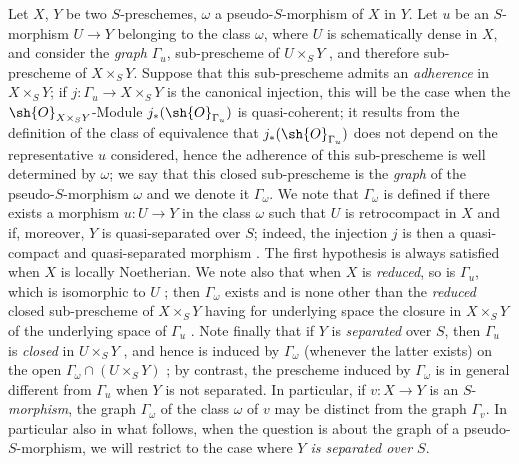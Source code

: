 \begin{env}[20.4.1]
\label{IV.20.4.1}
Let $X$, $Y$ be two $S$-preschemes, $\omega$ a pseudo-$S$-morphism of $X$ in $Y$.
Let $u$ be an $S$-morphism $U\to Y$ belonging to the class $\omega$, where $U$ is schematically dense in $X$, and consider the \emph{graph} $\Gamma_u$, sub-prescheme of $U\times_S Y$ , and therefore sub-prescheme of $X\times_S Y$.
Suppose that this sub-prescheme admits an \emph{adherence}  in $X\times_S Y$;
if $j:\Gamma_u\to X\times_S Y$ is the canonical injection, this will be the case when the $\sh{O}_{X\times_S Y}$-Module $j_*(\sh{O}_{\Gamma_u})$ is quasi-coherent;
it results from the definition of the class of equivalence  that $j_*(\sh{O}_{\Gamma_u})$ does not depend on the representative $u$ considered, hence the adherence of this sub-prescheme is well determined by $\omega$;
we say that this closed sub-prescheme is the \emph{graph} of the pseudo-$S$-morphism $\omega$ and we denote it $\Gamma_\omega$.
We note that $\Gamma_\omega$ is defined if there exists a morphism $u:U\to Y$ in the class $\omega$ such that $U$ is retrocompact in $X$ and if, moreover, $Y$ is quasi-separated over $S$;
indeed, the injection $j$ is then a quasi-compact and quasi-separated morphism .
The first hypothesis is always satisfied when $X$ is locally Noetherian.
We note also that when $X$ is \emph{reduced}, so is $\Gamma_u$, which is isomorphic to $U$ ;
then $\Gamma_\omega$ exists and is none other than the \emph{reduced} closed sub-prescheme of $X\times_S Y$ having for underlying space the closure in $X\times_S Y$ of the underlying space of $\Gamma_u$ .
Note finally that if $Y$ is \emph{separated} over $S$, then $\Gamma_u$ is \emph{closed} in $U\times_S Y$ , and hence is induced by $\Gamma_\omega$ (whenever the latter exists) on the open $\Gamma_\omega\cap(U\times_S Y)$ ;
by contrast, the prescheme induced by $\Gamma_\omega$ is in general different from $\Gamma_u$ when $Y$ is not separated.
In particular, if $v:X\to Y$ is an $S$-\emph{morphism}, the graph $\Gamma_\omega$ of the class $\omega$ of $v$ may be distinct from the graph $\Gamma_v$.
In particular also in what follows, when the question is about the graph of a pseudo-$S$-morphism, we will restrict to the case where \emph{$Y$ is separated over $S$}.
\end{env}

